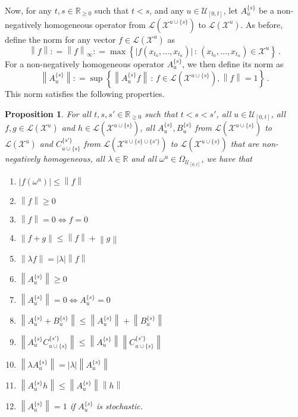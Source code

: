 \documentclass[10pt]{paper}
\newtheorem{proposition}[theorem]{Proposition}
\newcommand{\reals}{\mathbb{R}}
\newcommand{\realsnonneg}{\reals_{\geq 0}}
\newcommand{\states}{\mathcal{X}}
\newcommand{\gambles}{\mathcal{L}}
\newcommand{\asa}{\Leftrightarrow}
\newcommand{\norm}[1]{\left\lVert #1 \right\rVert}
\newcommand{\abs}[1]{\left\vert #1 \right\vert}
\newcommand{\coloneqq}{:\!=}
\begin{document}
Now, for any $t,s\in\realsnonneg$ such that $t<s$, and any $u\in\mathcal{U}_{[0,t]}$, let $A_u^{\{s\}}$ be a non-negatively homogeneous operator from $\gambles(\states^{u\cup \{s\}})$ to $\gambles(\states^u)$.
As before, define the norm for any vector $f\in\gambles(\states^u)$ as
\begin{equation*}
\norm{f}\coloneqq\norm{f}_\infty\coloneqq\max\left\{\bigl\vert f(x_{t_0},\ldots,x_{t_n})\bigr\vert\,:\,(x_{t_0},\ldots,x_{t_n})\in\states^u\right\}\,.
\end{equation*}
For a non-negatively homogeneous operator $A_u^{\{s\}}$, we then define its norm as
\begin{equation*}
\norm{A_u^{\{s\}}} \coloneqq \sup\left\{ \norm{A_u^{\{s\}}f}\,:\,f\in\gambles(\states^{u\cup \{s\}}),\norm{f}=1 \right\}\,.
\end{equation*}
This norm satisfies the following properties. 

\begin{proposition}For all $t,s,s'\in\realsnonneg$ such that $t<s<s'$, all $u\in\mathcal{U}_{[0,t]}$, all $f,g\in\gambles(\states^u)$ and $h\in\gambles(\states^{u\cup\{s\}})$, all $A_u^{\{s\}},B_u^{\{s\}}$ from $\gambles(\states^{u\cup \{s\}})$ to $\gambles(\states^u)$ and $C_{u\cup \{s\}}^{\{s'\}}$ from $\gambles(\states^{u\cup \{s\}\cup \{s'\}})$ to $\gambles(\states^{u\cup \{s\}})$ that are non-negatively homogeneous, all $\lambda\in\mathbb{R}$ and all $\omega^u\in\Omega_{\mathcal{U}_{[0,t]}}$, we have that
\vspace{5pt}

\begin{enumerate}[label=N\arabic*:]
\item
$\abs{f(\omega^u)}\leq\norm{f}$
\item
$\norm{f}\geq0$
\item
$\norm{f}=0\asa f=0$
\item
$\norm{f+g}\leq\norm{f}+\norm{g}$
\item
$\norm{\lambda f}=\abs{\lambda}\norm{f}$
\item
$\norm{A_u^{\{s\}}}\geq0$
\item
$\norm{A_u^{\{s\}}}=0\asa A_u^{\{s\}}=0$
\item
$\norm{A_u^{\{s\}}+B_u^{\{s\}}}\leq\norm{A_u^{\{s\}}}+\norm{B_u^{\{s\}}}$
\item
$\norm{A_u^{\{s\}}C_{u\cup \{s\}}^{\{s'\}}}\leq\norm{A_u^{\{s\}}}\norm{C_{u\cup \{s\}}^{\{s'\}}}$
\item
$\norm{\lambda A_u^{\{s\}}}=\abs{\lambda}\norm{A_u^{\{s\}}}$
\item
$\norm{A_u^{\{s\}}h}\leq\norm{A_u^{\{s\}}}\norm{h}$
\item
$\norm{A_u^{\{s\}}}=1$ if $A_u^{\{s\}}$ is stochastic.
\end{enumerate}
\vspace{5pt}
\end{proposition}
\end{document}
